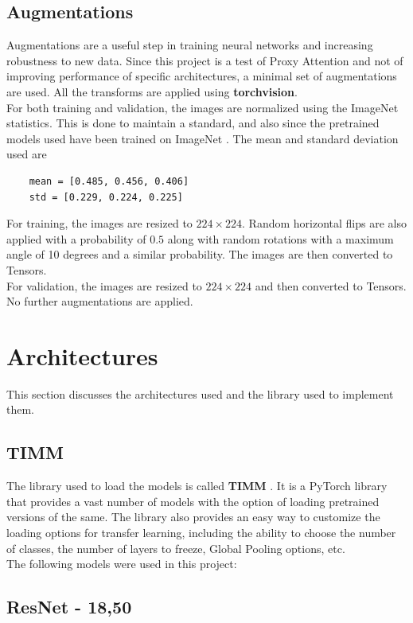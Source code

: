 \subsection{Augmentations}
Augmentations are a useful step in training neural networks and increasing robustness to new data. Since this project is a test of Proxy Attention and not of improving performance of specific architectures, a minimal set of augmentations are used. All the transforms are applied using \textbf{torchvision}.\\
For both training and validation, the images are normalized using the ImageNet statistics. This is done to maintain a standard, and also since the pretrained models used have been trained on ImageNet \cite{dengImageNetLargeScaleHierarchical2009}. The mean and standard deviation used are \begin{verbatim}
    mean = [0.485, 0.456, 0.406]
    std = [0.229, 0.224, 0.225]
\end{verbatim}
For training, the images are resized to $224\times224$. Random horizontal flips are also applied with a probability of $0.5$ along with random rotations with a maximum angle of 10 degrees and a similar probability. The images are then converted to Tensors.\\
For validation, the images are resized to $224\times224$ and then converted to Tensors. No further augmentations are applied.\\

\section{Architectures}
This section discusses the architectures used and the library used to implement them.

\subsection{TIMM}
The library used to load the models is called \textbf{TIMM} \cite{rw2019timm}. It is a PyTorch library that provides a vast number of models with the option of loading pretrained versions of the same. The library also provides an easy way to customize the loading options for transfer learning, including the ability to choose the number of classes, the number of layers to freeze, Global Pooling options, etc.\\
The following models were used in this project:

\subsection{ResNet - 18,50}
